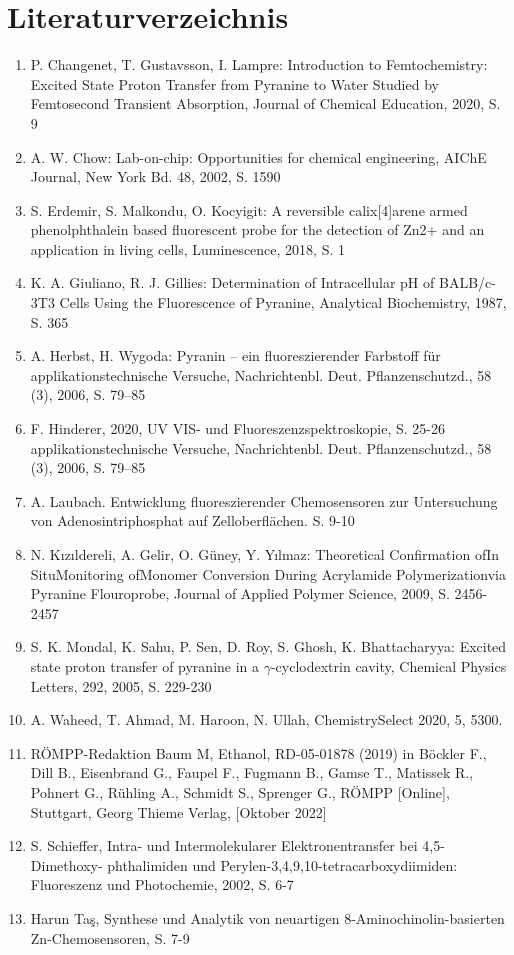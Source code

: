 \documentclass[12pt,a4paper]{report}
\begin{document}
	\chapter{Literaturverzeichnis}
	\begin{enumerate}
		\item P. Changenet, T. Gustavsson, I. Lampre: Introduction to Femtochemistry: Excited State Proton Transfer from Pyranine to Water Studied by Femtosecond Transient Absorption, Journal of Chemical Education, 2020, S. 9
		\item A. W. Chow: Lab-on-chip: Opportunities for chemical engineering, AIChE Journal, New York Bd. 48, 2002, S. 1590
		\item S. Erdemir, S. Malkondu, O. Kocyigit: A reversible calix[4]arene armed phenolphthalein based fluorescent probe for the detection of Zn2+ and an application in living cells, Luminescence, 2018, S. 1
		\item K. A. Giuliano, R. J. Gillies: Determination of Intracellular pH of BALB/c-3T3 Cells Using the Fluorescence of Pyranine, Analytical Biochemistry, 1987, S. 365
		\item A. Herbst, H. Wygoda: Pyranin – ein fluoreszierender Farbstoff für
		applikationstechnische Versuche, Nachrichtenbl. Deut. Pflanzenschutzd., 58 (3), 2006, S. 79–85
		\item F. Hinderer, 2020, UV VIS- und Fluoreszenzspektroskopie, S. 25-26 
		applikationstechnische Versuche, Nachrichtenbl. Deut. Pflanzenschutzd., 58 (3), 2006, S. 79–85
		\item A. Laubach. Entwicklung fluoreszierender Chemosensoren zur
		Untersuchung von Adenosintriphosphat auf
		Zelloberflächen. S. 9-10
		\item N. Kızıldereli, A. Gelir, O. Güney, Y. Yılmaz: Theoretical Confirmation ofIn SituMonitoring ofMonomer Conversion During Acrylamide Polymerizationvia Pyranine Flouroprobe, Journal of Applied Polymer Science, 2009, S. 2456-2457
		\item S. K. Mondal, K. Sahu, P. Sen, D. Roy, S. Ghosh, K. Bhattacharyya: Excited state proton transfer of pyranine in a $\gamma$-cyclodextrin cavity, Chemical Physics Letters, 292, 2005, S. 229-230
		\item A. Waheed, T. Ahmad, M. Haroon, N. Ullah, ChemistrySelect 2020, 5, 5300. 
		\item RÖMPP-Redaktion Baum M, Ethanol, RD-05-01878 (2019) in Böckler F., Dill B., Eisenbrand G., Faupel F., Fugmann B., Gamse T., Matissek R., Pohnert G., Rühling A., Schmidt S., Sprenger G., RÖMPP [Online], Stuttgart, Georg Thieme Verlag, [Oktober 2022]
		\item S. Schieffer, Intra- und Intermolekularer Elektronentransfer bei 4,5-Dimethoxy- phthalimiden und Perylen-3,4,9,10-tetracarboxydiimiden: Fluoreszenz und Photochemie, 2002, S. 6-7
		\item Harun Taş, Synthese und Analytik von neuartigen 8-Aminochinolin-basierten Zn-Chemosensoren, S. 7-9
		
	\end{enumerate}
\end{document}
